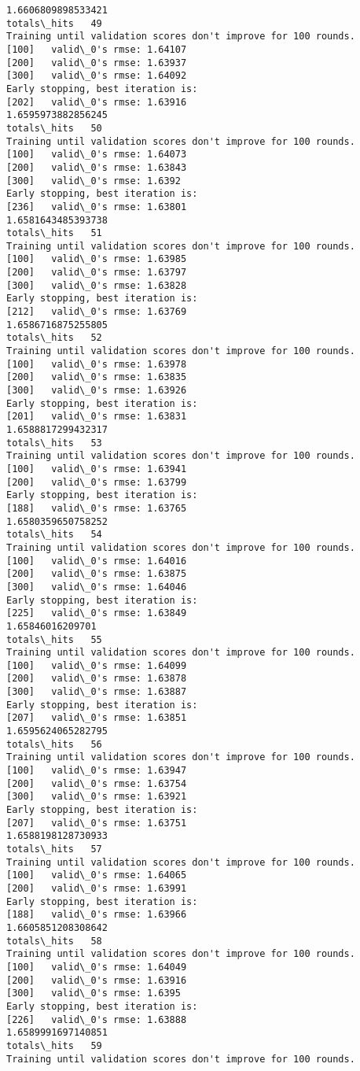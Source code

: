 \documentclass[11pt]{article}
\begin{document}
\begin{Verbatim}[commandchars=\\\{\}]
1.6606809898533421
totals\_hits   49
Training until validation scores don't improve for 100 rounds.
[100]	valid\_0's rmse: 1.64107
[200]	valid\_0's rmse: 1.63937
[300]	valid\_0's rmse: 1.64092
Early stopping, best iteration is:
[202]	valid\_0's rmse: 1.63916
1.6595973882856245
totals\_hits   50
Training until validation scores don't improve for 100 rounds.
[100]	valid\_0's rmse: 1.64073
[200]	valid\_0's rmse: 1.63843
[300]	valid\_0's rmse: 1.6392
Early stopping, best iteration is:
[236]	valid\_0's rmse: 1.63801
1.6581643485393738
totals\_hits   51
Training until validation scores don't improve for 100 rounds.
[100]	valid\_0's rmse: 1.63985
[200]	valid\_0's rmse: 1.63797
[300]	valid\_0's rmse: 1.63828
Early stopping, best iteration is:
[212]	valid\_0's rmse: 1.63769
1.6586716875255805
totals\_hits   52
Training until validation scores don't improve for 100 rounds.
[100]	valid\_0's rmse: 1.63978
[200]	valid\_0's rmse: 1.63835
[300]	valid\_0's rmse: 1.63926
Early stopping, best iteration is:
[201]	valid\_0's rmse: 1.63831
1.6588817299432317
totals\_hits   53
Training until validation scores don't improve for 100 rounds.
[100]	valid\_0's rmse: 1.63941
[200]	valid\_0's rmse: 1.63799
Early stopping, best iteration is:
[188]	valid\_0's rmse: 1.63765
1.6580359650758252
totals\_hits   54
Training until validation scores don't improve for 100 rounds.
[100]	valid\_0's rmse: 1.64016
[200]	valid\_0's rmse: 1.63875
[300]	valid\_0's rmse: 1.64046
Early stopping, best iteration is:
[225]	valid\_0's rmse: 1.63849
1.65846016209701
totals\_hits   55
Training until validation scores don't improve for 100 rounds.
[100]	valid\_0's rmse: 1.64099
[200]	valid\_0's rmse: 1.63878
[300]	valid\_0's rmse: 1.63887
Early stopping, best iteration is:
[207]	valid\_0's rmse: 1.63851
1.6595624065282795
totals\_hits   56
Training until validation scores don't improve for 100 rounds.
[100]	valid\_0's rmse: 1.63947
[200]	valid\_0's rmse: 1.63754
[300]	valid\_0's rmse: 1.63921
Early stopping, best iteration is:
[207]	valid\_0's rmse: 1.63751
1.6588198128730933
totals\_hits   57
Training until validation scores don't improve for 100 rounds.
[100]	valid\_0's rmse: 1.64065
[200]	valid\_0's rmse: 1.63991
Early stopping, best iteration is:
[188]	valid\_0's rmse: 1.63966
1.6605851208308642
totals\_hits   58
Training until validation scores don't improve for 100 rounds.
[100]	valid\_0's rmse: 1.64049
[200]	valid\_0's rmse: 1.63916
[300]	valid\_0's rmse: 1.6395
Early stopping, best iteration is:
[226]	valid\_0's rmse: 1.63888
1.6589991697140851
totals\_hits   59
Training until validation scores don't improve for 100 rounds.

\end{Verbatim}
\end{document}
